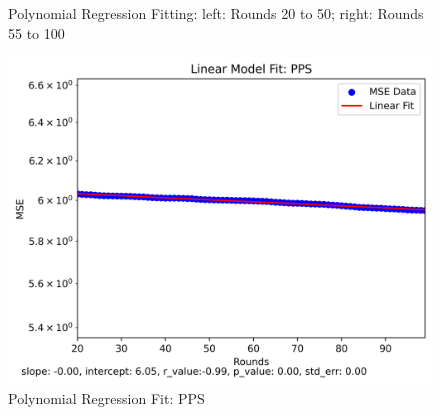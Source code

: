 \begin{figure}[!ht]
    \centering
    \hfil
    \caption{Polynomial Regression Fitting: left: Rounds 20 to 50; right: Rounds 55 to 100}
        \label{fig:8x128dabRingOfCliquesModelFit}
\end{figure}
\begin{figure}[H]
    \centering
    \includegraphics[width=\linewidth]{figures/Simulation_outcomes/RingOfCliques/8x128/PPS/PPS_modelfitting_rounds_99_model_0.png}
    \caption{Polynomial Regression Fit: PPS}
    \label{fig:8x128ppsRingOfCliquesModelFit}
\end{figure}

